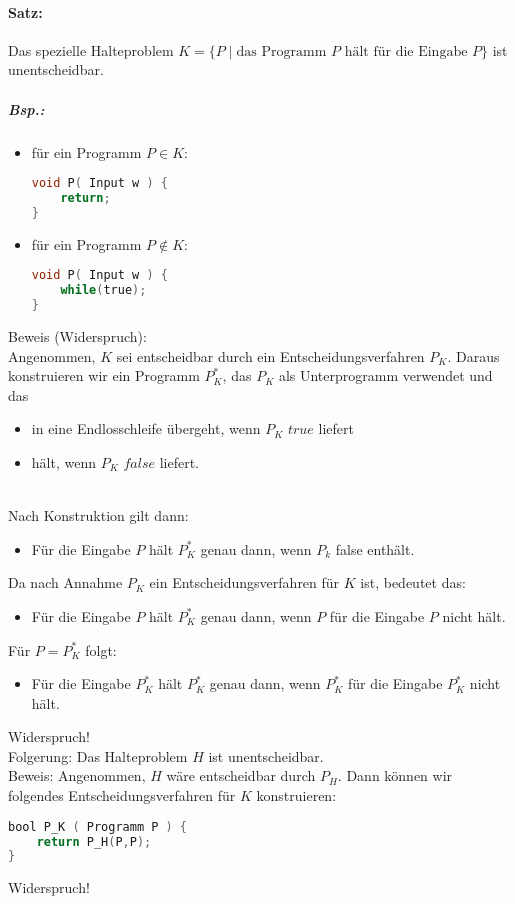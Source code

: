 \documentclass{scrreprt}
\begin{document}
\paragraph{Satz:} Das spezielle Halteproblem $K=\{P\;|\;\text{das Programm $P$ hält für die Eingabe }P\}$ ist unentscheidbar.
\subparagraph{Bsp.:}
\begin{itemize}
\item für ein Programm $P \in K$:\begin{lstlisting}[language=C]
void P( Input w ) {
	return;
}
\end{lstlisting}
\item für ein Programm $P \not \in K$:
\begin{lstlisting}[language=C]
void P( Input w ) {
	while(true);
}
\end{lstlisting}
\end{itemize}
Beweis (Widerspruch):\\
Angenommen, $K$ sei entscheidbar durch ein Entscheidungsverfahren $P_K$. Daraus konstruieren wir ein Programm $P_K^*$, das $P_K$ als Unterprogramm verwendet und das
\begin{itemize}
\item in eine Endlosschleife übergeht, wenn $P_K$ $true$ liefert
\item hält, wenn $P_K$ $false$ liefert.
\end{itemize}
\\
Nach Konstruktion gilt dann:
\begin{itemize}
\item Für die Eingabe $P$ hält $P_K^*$ genau dann, wenn $P_k$ false enthält.
\end{itemize}
Da nach Annahme $P_K$ ein Entscheidungsverfahren für $K$ ist, bedeutet das:
\begin{itemize}
\item Für die Eingabe $P$ hält $P_K^*$ genau dann, wenn $P$ für die Eingabe $P$ nicht hält.
\end{itemize}
Für $P=P_K^*$ folgt:
\begin{itemize}
\item Für die Eingabe $P_K^*$ hält $P_K^*$ genau dann, wenn $P_K^*$ für die Eingabe $P_K^*$ nicht hält.
\end{itemize}
Widerspruch!\medskip\\
Folgerung: Das Halteproblem $H$ ist unentscheidbar.\\
Beweis: Angenommen, $H$ wäre entscheidbar durch $P_H$. Dann können wir folgendes Entscheidungsverfahren für $K$ konstruieren:
\begin{lstlisting}[language=C]
bool P_K ( Programm P ) {
	return P_H(P,P);
}
\end{lstlisting}
Widerspruch!
\end{document}
